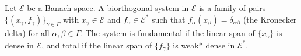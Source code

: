 Let $\mathcal{E}$ be a Banach space. A biorthogonal system in $\mathcal{E}$ is a family of pairs $\{(x_\gamma, f_\gamma)\}_{\gamma \in \Gamma}$ with $x_\gamma \in \mathcal{E}$ and $f_\gamma \in \mathcal{E}^*$ such that $f_\alpha(x_\beta) = \delta_{\alpha\beta}$ (the Kronecker delta) for all $\alpha, \beta \in \Gamma$. The system is fundamental if the linear span of $\{x_\gamma\}$ is dense in $\mathcal{E}$, and total if the linear span of $\{f_\gamma\}$ is weak* dense in $\mathcal{E}^*$.
